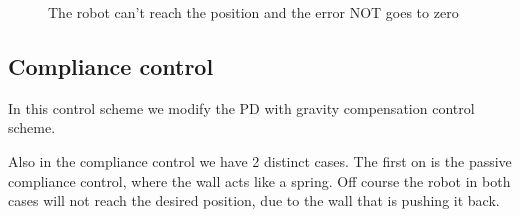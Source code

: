 \documentclass{article}
\begin{document}
\begin{figure}[H]
    \centering
    \caption{The robot can't reach the position and the error NOT goes to zero}
    \label{fig:The robot can't reach the positionnm}
\end{figure}










\newpage

\subsection{Compliance control}

In this control scheme we modify the PD with gravity compensation control scheme.

Also in the compliance control we have 2 distinct cases. The first on is the passive compliance control, where the wall acts like a spring.
Off course the robot in both cases will not reach the desired position, due to the wall that is pushing it back.
\end{document}
